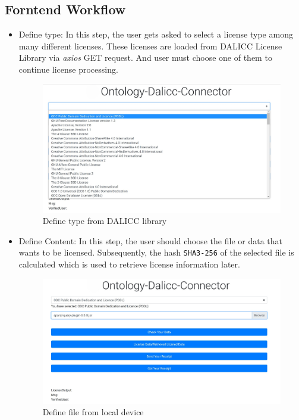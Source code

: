 \subsection{Forntend Workflow}
\begin{itemize}
	\item Define type:
	In this step, the user gets asked to select a license type among many different licenses. These licenses are loaded from DALICC License Library via \textit{axios} GET request. And user must choose one of them to continue license processing.
 \begin{center}
	\begin{figure}[htb!]
		
		\begin{minipage}{0.45\linewidth}
			\centering
			\includegraphics[width=1.95\textwidth]{images/chap03_selectType.jpg}
		\end{minipage}
		\caption[Define type from DALICC library]{Define type from DALICC library}
		
	\end{figure}
	
\end{center}
	\item Define Content:
	In this step, the user should choose the file or data that wants to be licensed. Subsequently, the hash \texttt{SHA3-256} of the selected file is calculated which is used to retrieve license information later.
 \begin{center}
	\begin{figure}[htb!]
		
		\begin{minipage}{0.45\linewidth}
			\centering
			\includegraphics[width=1.95\textwidth]{images/chap03_selectFile.jpg}
		\end{minipage}
		\caption[Define file from local device]{Define file from local device}
		

\end{figure}
\end{center}
\end{itemize}
